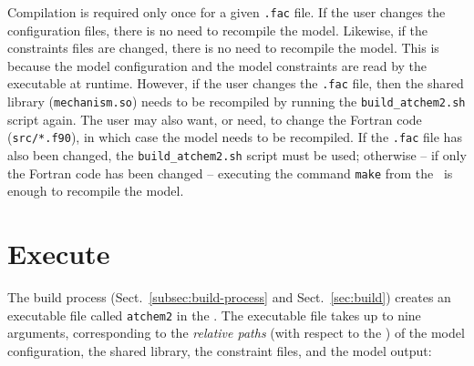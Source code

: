 Compilation is required only once for a given \texttt{.fac} file. If
the user changes the configuration files, there is no need to
recompile the model. Likewise, if the constraints files are changed,
there is no need to recompile the model. This is because the model
configuration and the model constraints are read by the executable at
runtime. However, if the user changes the \texttt{.fac} file, then the
shared library (\texttt{mechanism.so}) needs to be recompiled by
running the \texttt{build\_atchem2.sh} script again. The user may also
want, or need, to change the Fortran code (\texttt{src/*.f90}), in
which case the model needs to be recompiled. If the \texttt{.fac} file
has also been changed, the \texttt{build\_atchem2.sh} script must be
used; otherwise -- if only the Fortran code has been changed --
executing the command \verb|make| from the \maindir\ is enough to
recompile the model.

\section{Execute} \label{sec:execute}

The build process (Sect.~\ref{subsec:build-process} and
Sect.~\ref{sec:build}) creates an executable file called
\texttt{atchem2} in the \maindir. The executable file takes up to nine
arguments, corresponding to the \emph{relative paths} (with respect to
the \maindir) of the model configuration, the shared library, the
constraint files, and the model output:

